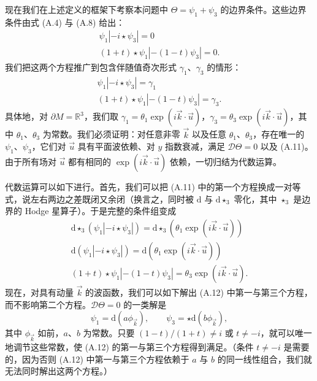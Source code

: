 \documentclass[11pt,a4paper,UTF8]{ctexart}
\theoremstyle{plain}
\theoremstyle{definition}
\begin{document}

现在我们在上述定义的框架下考察本问题中 $\Theta=\psi_1+\psi_3$ 的边界条件。这些边界条件由式 (A.4) 与 (A.8) 给出：
\begin{equation}
    \begin{gathered}
        \psi_1|-i\star\psi_3|=0\\
        (1+t)\star\psi_1|-(1-t)\psi_3|=0 .
    \end{gathered}
    \tag{A.10}
\end{equation}
我们把这两个方程推广到包含伴随值奇次形式 $\gamma_1$、$\gamma_3$ 的情形：
\begin{equation}
    \begin{gathered}
        \psi_1|-i\star\psi_3|=\gamma_1\\
        (1+t)\star\psi_1|-(1-t)\psi_3|=\gamma_3 .
    \end{gathered}
    \tag{A.11}
\end{equation}
具体地，对 $\partial M=\mathbb{R}^3$，我们取 $\gamma_1=\theta_1\exp(i\vec{k}\cdot\vec{u})$，$\gamma_3=\theta_3\exp(i\vec{k}\cdot\vec{u})$，其中 $\theta_1$、$\theta_3$ 为常数。我们必须证明：对任意非零 $\vec{k}$ 以及任意 $\theta_1$、$\theta_3$，存在唯一的 $\psi_1$、$\psi_3$，它们对 $\vec{u}$ 具有平面波依赖、对 $y$ 指数衰减，满足 $\mathcal{D}\Theta=0$ 以及 (A.11)。由于所有场对 $\vec{u}$ 都有相同的 $\exp(i\vec{k}\cdot\vec{u})$ 依赖，一切归结为代数运算。

代数运算可以如下进行。首先，我们可以把 (A.11) 中的第一个方程换成一对等式，说左右两边之差既闭又余闭（换言之，同时被 $\mathrm{d}$ 与 $\mathrm{d}\star_3$ 零化，其中 $\star_3$ 是边界的 Hodge 星算子）。于是完整的条件组变成
\begin{equation}
    \begin{gathered}
        \mathrm{d}\star_3\left(\psi_1|-i\star\psi_3|\right)=\mathrm{d}\star_3\left(\theta_1\exp(i\vec{k}\cdot\vec{u})\right)\\
        \mathrm{d}\left(\psi_1|-i\star\psi_3|\right)=\mathrm{d}\left(\theta_1\exp(i\vec{k}\cdot\vec{u})\right)\\
        (1+t)\star\psi_1|-(1-t)\psi_3|=\theta_3\exp(i\vec{k}\cdot\vec{u}).
    \end{gathered}
    \tag{A.12}
\end{equation}
现在，对具有动量 $\vec{k}$ 的波函数，我们可以如下解出 (A.12) 中第一与第三个方程，而不影响第二个方程。$\mathcal{D}\Theta=0$ 的一类解是
\begin{equation}
    \psi_1=\mathrm{d}(a\phi_{\vec{k}}),\qquad \psi_3=\star\mathrm{d}(b\phi_{\vec{k}}),
    \tag{A.13}
\end{equation}
其中 $\phi_{\vec{k}}$ 如前，$a$、$b$ 为常数。只要 $(1-t)/(1+t)\neq i$ 或 $t\neq -i$，就可以唯一地调节这些常数，使 (A.12) 的第一与第三个方程得到满足。（条件 $t\neq -i$ 是需要的，因为否则 (A.12) 中第一与第三个方程依赖于 $a$ 与 $b$ 的同一线性组合，我们就无法同时解出这两个方程。）
\end{document}
